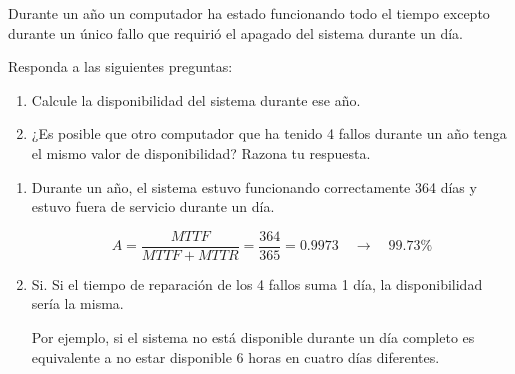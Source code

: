 \begin{acexercise}\end{acexercise}

Durante un año un computador ha estado funcionando todo el tiempo excepto
durante un único fallo que requirió el apagado del sistema durante un día.

Responda a las siguientes preguntas:

\begin{enumerate}

  \item Calcule la disponibilidad del sistema durante ese año.

  \item ¿Es posible que otro computador que ha tenido 4 fallos durante un año
        tenga el mismo valor de disponibilidad? Razona tu respuesta.

\end{enumerate}

\begin{acsolution}\end{acsolution}

\begin{enumerate}

\item

Durante un año, el sistema estuvo funcionando correctamente 364 días y estuvo
fuera de servicio durante un día.

\[
A = \frac{MTTF}{MTTF + MTTR} = \frac{364}{365} = 0.9973 \quad
\rightarrow \quad 99.73\%
\]

\item

Si. Si el tiempo de reparación de los 4 fallos suma 1 día, la disponibilidad sería la misma.

Por ejemplo, si el sistema no está disponible durante un día completo
es equivalente a no estar disponible 6 horas en cuatro días diferentes.

\end{enumerate}
